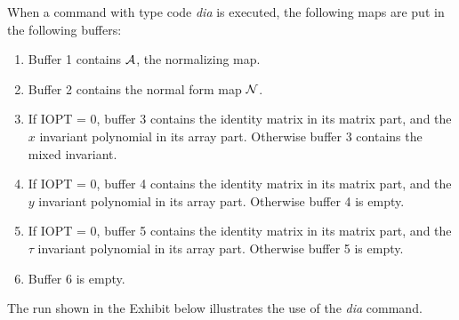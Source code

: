 When a command with type code {\em dia } is executed, the following maps
are put in the following buffers:
\begin{enumerate}
           \item  Buffer 1 contains ${\cal A}$, the normalizing map.

           \item  Buffer 2 contains the normal form map ${\cal N}$.

           \item  If IOPT = 0, buffer 3 contains the identity matrix in its
                  matrix part, and the $x$ invariant polynomial in its array
                  part.  Otherwise buffer 3 contains the mixed invariant.

           \item  If IOPT = 0, buffer 4 contains the identity matrix in its
                  matrix part, and the $y$ invariant polynomial in its array
                  part.  Otherwise buffer 4 is empty.

           \item  If IOPT = 0, buffer 5 contains the identity matrix in its
                  matrix part, and the $\tau$ invariant polynomial in its array
                  part.  Otherwise buffer 5 is empty.

		   \item  Buffer 6 is empty.
\end{enumerate}

The \Mary run shown in the Exhibit below illustrates the use of the {\em dia} command.

